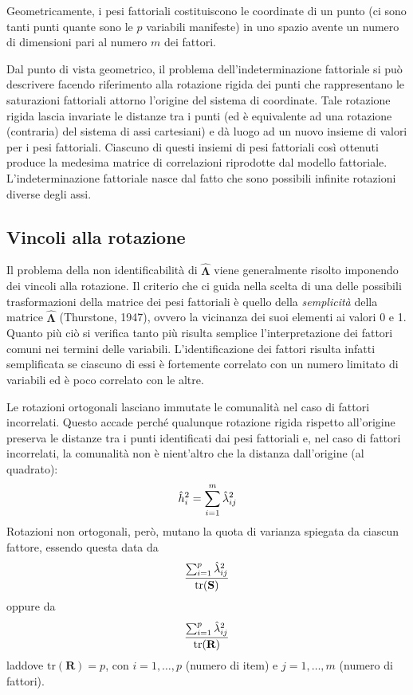 \begin{defn}
Geometricamente, i pesi fattoriali costituiscono le coordinate di un
punto (ci sono tanti punti quante sono le $p$ variabili manifeste)
in uno spazio avente un numero di dimensioni pari al numero $m$ dei
fattori.  
\end{defn}

Dal punto di vista geometrico, il problema dell'indeterminazione fattoriale si può descrivere facendo riferimento alla rotazione rigida dei punti che rappresentano le saturazioni fattoriali attorno l'origine del sistema
di coordinate. Tale rotazione rigida lascia invariate le distanze tra i punti (ed è
equivalente ad una rotazione (contraria) del sistema di assi
cartesiani) e dà luogo ad un nuovo insieme di valori per i pesi fattoriali.  Ciascuno di questi insiemi di pesi fattoriali così ottenuti produce la medesima matrice di correlazioni riprodotte dal modello fattoriale. L'indeterminazione fattoriale nasce dal fatto che sono possibili infinite rotazioni diverse degli assi.

\subsection{Vincoli alla rotazione}

 Il problema della non identificabilità di $\hat{\boldsymbol{\Lambda}}$ viene
generalmente risolto imponendo dei vincoli alla rotazione.
Il criterio che ci guida nella scelta di una delle possibili
trasformazioni della matrice dei pesi fattoriali è quello della
\textit{semplicità} della matrice $\hat{\boldsymbol{\Lambda}}$
(Thurstone, 1947), ovvero la vicinanza dei suoi elementi ai valori 0 e
1.  Quanto più ciò si verifica tanto più risulta semplice
l'interpretazione dei fattori comuni nei termini delle
variabili.  L'identificazione dei fattori risulta infatti semplificata
se ciascuno di essi è fortemente correlato con un numero limitato di
variabili ed è poco correlato con le altre.

Le rotazioni ortogonali lasciano immutate le comunalità nel caso di fattori incorrelati. Questo accade perché qualunque rotazione rigida rispetto all'origine preserva le distanze tra i punti identificati dai pesi fattoriali e, nel caso di fattori incorrelati, la comunalità non  è nient'altro che la distanza dall'origine (al quadrato):
\begin{equation}
\hat{h}^2_i = \sum_{i=1}^m \hat{\lambda}_{ij}^2\notag
\end{equation}
Rotazioni non ortogonali, però, mutano la quota di varianza spiegata da
ciascun fattore, essendo questa data da 
\begin{equation}
\frac{\sum_{i=1}^p \hat{\lambda}_{ij}^2}{\text{tr}(\textbf{S})}\notag
\end{equation}
oppure da
\begin{equation}
\frac{\sum_{i=1}^p \hat{\lambda}_{ij}^2}{\text{tr}(\textbf{R})}\notag
\end{equation}
laddove $\text{tr}(\textbf{R})=p$, con $i=1, \dots, p$ (numero di
item) e $j=1, \dots, m$ (numero di fattori).

